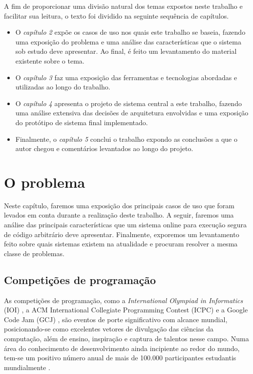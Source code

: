 \documentclass[ruledheader, 12pt]{abnt}
\begin{document}
A fim de proporcionar uma divisão natural dos temas expostos neste trabalho e facilitar sua leitura, o texto foi dividido na seguinte sequência de capítulos.
\begin{itemize}
	\item O \emph{capítulo 2} expõe os casos de uso nos quais este trabalho se baseia, fazendo uma exposição do problema e uma análise das características que o sistema sob estudo deve apresentar. Ao final, é feito um levantamento do material existente sobre o tema.
	\item O \emph{capítulo 3} faz uma exposição das ferramentas e tecnologias abordadas e utilizadas ao longo do trabalho.
	\item O \emph{capítulo 4} apresenta o projeto de sistema central a este trabalho, fazendo uma análise extensiva das decisões de arquitetura envolvidas e uma exposição do protótipo de sistema final implementado.
	\item Finalmente, o \emph{capítulo 5} conclui o trabalho expondo as conclusões a que o autor chegou e comentários levantados ao longo do projeto.
\end{itemize}

\chapter{O problema}

Neste capítulo, faremos uma exposição dos principais casos de uso que foram levados em conta durante a realização deste trabalho. A seguir, faremos uma análise das principais características que um sistema online para execução segura de código arbitrário deve apresentar. Finalmente, exporemos um levantamento feito sobre quais sistemas existem na atualidade e procuram resolver a mesma classe de problemas.

\section{Competições de programação}


As competições de programação, como a \emph{International Olympiad in Informatics} (IOI) \cite{ioinformatics}, a ACM International Collegiate Programming Contest (ICPC) \cite{acmicpc} e a Google Code Jam (GCJ) \cite{googlecodejam}, são eventos de porte significativo com alcance mundial, posicionando-se como excelentes vetores de divulgação das ciências da computação, além de ensino, inspiração e captura de talentos nesse campo. Numa área do conhecimento de desenvolvimento ainda incipiente ao redor do mundo, tem-se um positivo número anual de mais de 100.000 participantes estudantis mundialmente \cite{icpcfactsheet,wang2010selection}.
\end{document}
